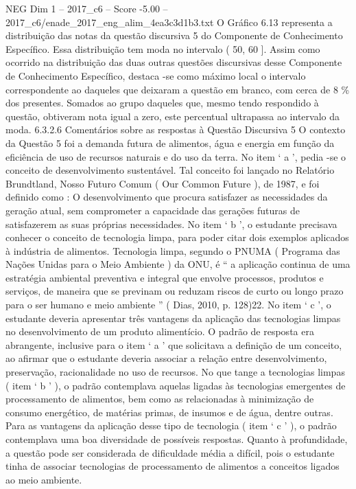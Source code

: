 \begin{textsample}{NEG Dim 1 – 2017\_c6 – Score -5.00 – 2017\_c6/enade\_2017\_eng\_alim\_4ea3c3d1b3.txt}
O Gráfico 6.13 representa a distribuição das notas da questão discursiva 5 do Componente de Conhecimento Específico.
Essa distribuição tem moda no intervalo ( 50, 60 ].
Assim como ocorrido na distribuição das duas outras questões discursivas desse Componente de Conhecimento Específico, destaca -se como máximo local o intervalo correspondente ao daqueles que deixaram a questão em branco, com cerca de 8 \% dos presentes.
Somados ao grupo daqueles que, mesmo tendo respondido à questão, obtiveram nota igual a zero, este percentual ultrapassa ao intervalo da moda. 6.3.2.6 Comentários sobre as respostas à Questão Discursiva 5 O contexto da Questão 5 foi a demanda futura de alimentos, água e energia em função da eficiência de uso de recursos naturais e do uso da terra.
No item ‘ a ’, pedia -se o conceito de desenvolvimento sustentável.
Tal conceito foi lançado no Relatório Brundtland, Nosso Futuro Comum ( Our Common Future ), de 1987, e foi definido como : O desenvolvimento que procura satisfazer as necessidades da geração atual, sem comprometer a capacidade das gerações futuras de satisfazerem as suas próprias necessidades.
No item ‘ b ’, o estudante precisava conhecer o conceito de tecnologia limpa, para poder citar dois exemplos aplicados à indústria de alimentos.
Tecnologia limpa, segundo o PNUMA ( Programa das Nações Unidas para o Meio Ambiente ) da ONU, é “ a aplicação continua de uma estratégia ambiental preventiva e integral que envolve processos, produtos e serviços, de maneira que se previnam ou reduzam riscos de curto ou longo prazo para o ser humano e meio ambiente ” ( Dias, 2010, p. 128)22.
No item ‘ c ’, o estudante deveria apresentar três vantagens da aplicação das tecnologias limpas no desenvolvimento de um produto alimentício.
O padrão de resposta era abrangente, inclusive para o item ‘ a ’ que solicitava a definição de um conceito, ao afirmar que o estudante deveria associar a relação entre desenvolvimento, preservação, racionalidade no uso de recursos.
No que tange a tecnologias limpas ( item ‘ b ’ ), o padrão contemplava aquelas ligadas às tecnologias emergentes de processamento de alimentos, bem como as relacionadas à minimização de consumo energético, de matérias primas, de insumos e de água, dentre outras.
Para as vantagens da aplicação desse tipo de tecnologia ( item ‘ c ’ ), o padrão contemplava uma boa diversidade de possíveis respostas.
Quanto à profundidade, a questão pode ser considerada de dificuldade média a difícil, pois o estudante tinha de associar tecnologias de processamento de alimentos a conceitos ligados ao meio ambiente.

\end{textsample}
